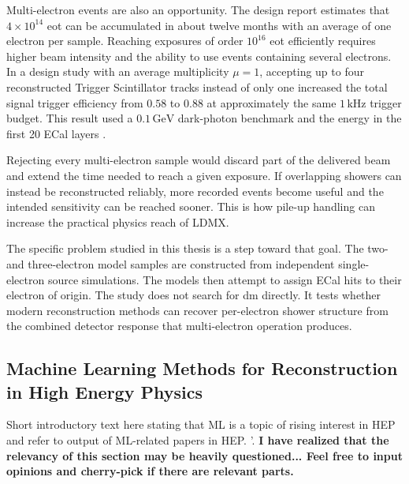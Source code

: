 Multi-electron events are also an opportunity. The design report estimates
that \(4\times10^{14}\) \gls{eot} can be accumulated in about twelve months
with an average of one electron per sample. Reaching exposures of order
\(10^{16}\) \gls{eot} efficiently requires higher beam intensity and the
ability to use events containing several electrons. In a design study with
an average multiplicity \(\mu=1\), accepting up to four reconstructed
Trigger Scintillator tracks instead of only one increased the total signal
trigger efficiency from \(0.58\) to \(0.88\) at approximately the same
\(1\,\mathrm{kHz}\) trigger budget. This result used a
\(0.1\,\mathrm{GeV}\) dark-photon benchmark and the energy in the first 20
ECal layers \cite{ldmx2025-overview}.


Rejecting every multi-electron sample would discard part of the delivered
beam and extend the time needed to reach a given exposure. If overlapping
showers can instead be reconstructed reliably, more recorded events become
useful and the intended sensitivity can be reached sooner. This is how
pile-up handling can increase the practical physics reach of LDMX.

The specific problem studied in this thesis is a step toward that goal. The
two- and three-electron model samples are constructed from independent
single-electron source simulations. The models then attempt to assign ECal
hits to their electron of origin. The study does not search for \gls{dm}
directly. It tests whether modern reconstruction methods can recover
per-electron shower structure from the combined detector response that
multi-electron operation produces.



\subsection{Machine Learning Methods for Reconstruction in High Energy Physics}
\label{sec:ml_event_reconstruction_hep}


Short introductory text here stating that ML is a topic of rising interest in HEP and refer to output of ML-related papers in HEP. \cite{iml-wg-hepml-livingreview}'. \textbf{I have realized that the relevancy of this section may be heavily questioned... Feel free to input opinions and cherry-pick if there are relevant parts.}


